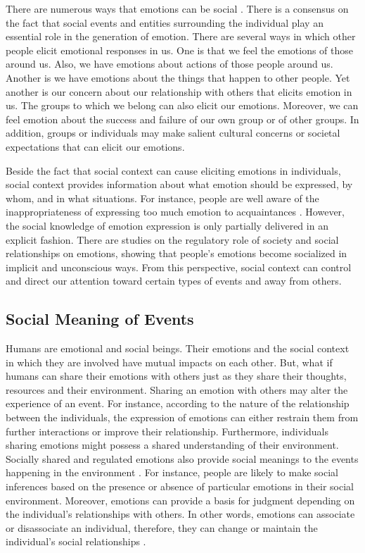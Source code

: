 \documentclass[11pt]{article}
\begin{document}
There are numerous ways that emotions can be
social \cite{tiedens:social-life}. There is a consensus on the fact that social
events and entities surrounding the individual play an essential role in the
generation of emotion. There are several ways in which other people elicit
emotional responses in us. One is that we feel the emotions of those around us.
Also, we have emotions about actions of those people around us. Another is we
have emotions about the things that happen to other people. Yet another is our
concern about our relationship with others that elicits emotion in us. The
groups to which we belong can also elicit our emotions. Moreover, we can feel
emotion about the success and failure of our own group or of other groups. In
addition, groups or individuals may make salient cultural concerns or societal
expectations that can elicit our emotions.

Beside the fact that social context can cause eliciting emotions in individuals,
social context provides information about what emotion should be expressed, by
whom, and in what situations. For instance, people are well aware of the
inappropriateness of expressing too much emotion to acquaintances
\cite{tiedens:social-life}. However, the social knowledge of emotion expression
is only partially delivered in an explicit fashion. There are studies on the
regulatory role of society and social relationships on emotions, showing that
people's emotions become socialized in implicit and unconscious ways. From this
perspective, social context can control and direct our attention toward certain
types of events and away from others.

\subsection{Social Meaning of Events}

Humans are emotional and social beings. Their emotions and the social context
in which they are involved have mutual impacts on each other. But, what if
humans can share their emotions with others just as they share their thoughts,
resources and their environment. Sharing an emotion with others may alter the
experience of an event. For instance, according to the nature of the
relationship between the individuals, the expression of emotions can either
restrain them from further interactions or improve their relationship.
Furthermore, individuals sharing emotions might possess a shared understanding
of their environment. Socially shared and regulated emotions also provide social
meanings to the events happening in the environment
\cite{wisecup:sociology-emotions}. For instance, people are likely to make
social inferences based on the presence or absence of particular emotions in
their social environment. Moreover, emotions can provide a basis for judgment
depending on the individual's relationships with others. In other words,
emotions can associate or disassociate an individual, therefore, they can change
or maintain the individual's social relationships \cite{tiedens:social-life}.
\end{document}
